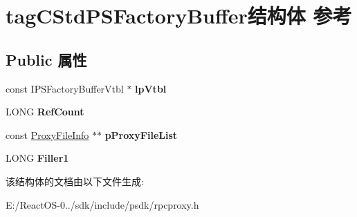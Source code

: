 \hypertarget{structtag_c_std_p_s_factory_buffer}{}\section{tag\+C\+Std\+P\+S\+Factory\+Buffer结构体 参考}
\label{structtag_c_std_p_s_factory_buffer}
\subsection*{Public 属性}
\begin{DoxyCompactItemize}
\item 
\mbox{\label{structtag_c_std_p_s_factory_buffer_aa1a9d7b6ef1bd6d81949e1d1c55bcaa0}} 
const I\+P\+S\+Factory\+Buffer\+Vtbl $\ast$ {\bfseries lp\+Vtbl}
\item 
\mbox{\label{structtag_c_std_p_s_factory_buffer_ad792eb9cf3df243406d9b61e8088bc17}} 
L\+O\+NG {\bfseries Ref\+Count}
\item 
\mbox{\label{structtag_c_std_p_s_factory_buffer_a9ecf58113ab12a98ed5e4c1dd21f2043}} 
const \hyperlink{structtag_proxy_file_info}{Proxy\+File\+Info} $\ast$$\ast$ {\bfseries p\+Proxy\+File\+List}
\item 
\mbox{\label{structtag_c_std_p_s_factory_buffer_a4f14d3ecd79298f100b853485ab0bdda}} 
L\+O\+NG {\bfseries Filler1}
\end{DoxyCompactItemize}


该结构体的文档由以下文件生成\+:\begin{DoxyCompactItemize}
\item 
E\+:/\+React\+O\+S-\/0../sdk/include/psdk/rpcproxy.\+h\end{DoxyCompactItemize}
